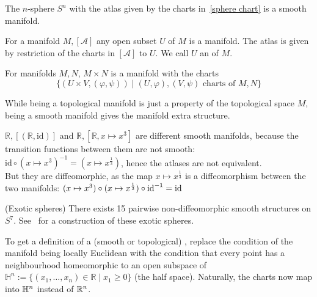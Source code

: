 \documentclass[a4paper,11pt]{article}
\begin{document}
\begin{example}[Spheres]
    The \(n\)-sphere \(S^n\) with the atlas given by the charts in\ \ref{sphere chart} is a smooth manifold.
\end{example}

\begin{example}
    For a manifold \(M,[\mathcal{A}]\) any open subset \(U\) of \(M\) is a manifold. 
    The atlas is given by restriction of the charts in \([\mathcal{A}]\) to \(U\). 
    We call \(U\) an  of \(M\).
\end{example}

\begin{example}
    For manifolds \(M,N\), \(M\times N\) is a manifold with the charts\[\{(U\times V,(\varphi,\psi))\mid(U,\varphi),(V,\psi)\text{ charts of }M,N\}\]
\end{example}

\begin{remark}
    While being a topological manifold is just a property of the topological space \(M\), being a smooth manifold gives the manifold extra structure.
\end{remark}

\begin{example}
    \(\mathbb{R},[(\mathbb{R},\mathrm{id})]\) and \(\mathbb{R},[\mathbb{R},x\mapsto x^3]\) are different smooth manifolds, because the transition functions between them are not smooth: 
    \(\mathrm{id}\circ(x\mapsto x^3)^{-1}=(x\mapsto x^{\frac13})\), hence the atlases are not equivalent.\\
    But they are diffeomorphic, as the map \(x\mapsto x^{\frac{1}{3}}\) is a diffeomorphism between the two manifolds: 
    \((x\mapsto x^3)\circ (x\mapsto x^{\frac13})\circ \mathrm{id}^{-1}= \mathrm{id}\)
\end{example}


\begin{example}(Exotic spheres)
    There exists 15 pairwise non-diffeomorphic smooth structures on \(S^7\). See\ \cite{kervaire} for a construction of these exotic spheres.
\end{example}

\begin{definition}
    To get a definition of a (smooth or topological) , replace the condition of the manifold being locally Euclidean with the condition that every point has a neighbourhood homeomorphic to an open subspace of \(\mathbb{H}^n:=\{(x_1,\dots,x_n)\in\mathbb{R}\mid x_1\geq0\}\) (the half space). Naturally, the charts now map into \(\mathbb{H}^n\) instead of \(\mathbb{R}^n\).
\end{definition}
\end{document}
